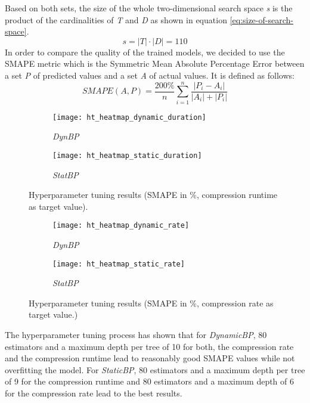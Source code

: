 Based on both sets, the size of the whole two-dimensional search space \emph{s} is the product of the cardinalities of \emph{T} and \emph{D} as shown in equation \ref{eq:size-of-search-space}.
\begin{equation} \label{eq:size-of-search-space}
    s = |T| \cdot |D| = 110 
\end{equation}
In order to compare the quality of the trained models, we decided to use the SMAPE metric which is the Symmetric Mean Absolute Percentage Error between a set \emph{P} of predicted values and a set \emph{A} of actual values. It is defined as follows:
\begin{equation} \label{eq:smape}
    SMAPE(A,P) = \frac{200\%}{n} \sum_{i = 1}^{n} \frac{|P_{i} - A_{i}|}{|A_{i}| + |P_{i}|}
\end{equation}
\begin{figure}[h]
    \centering
    \begin{subfigure}{.5\textwidth}
      \centering
      \texttt{[image: ht\_heatmap\_dynamic\_duration]}
      \caption{\emph{DynBP}}
    \end{subfigure}%
    \begin{subfigure}{.5\textwidth}
      \centering
      \texttt{[image: ht\_heatmap\_static\_duration]}
      \caption{\emph{StatBP}}
    \end{subfigure}%
    \caption{Hyperparameter tuning results (SMAPE in \%, compression runtime as target value).}
    \label{fig:hyperparameter-heatmap-duration}
\end{figure}
\begin{figure}[h]
    \centering
    \begin{subfigure}{.5\textwidth}
      \centering
      \texttt{[image: ht\_heatmap\_dynamic\_rate]}
      \caption{\emph{DynBP}}
    \end{subfigure}%
    \begin{subfigure}{.5\textwidth}
      \centering
      \texttt{[image: ht\_heatmap\_static\_rate]}
      \caption{\emph{StatBP}}
    \end{subfigure}%
    \caption{Hyperparameter tuning results (SMAPE in \%, compression rate as target value.)}
    \label{fig:hyperparameter-heatmap-compression-rate}
\end{figure}

The hyperparameter tuning process has shown that for \emph{DynamicBP}, 80 estimators and a maximum depth per tree of 10 for both, the compression rate and the compression runtime lead to reasonably good SMAPE values while not overfitting the model.
For \emph{StaticBP},  80 estimators and a maximum depth per tree of 9 for the compression runtime and 80 estimators and a maximum depth of 6 for the compression rate lead to the best results.


